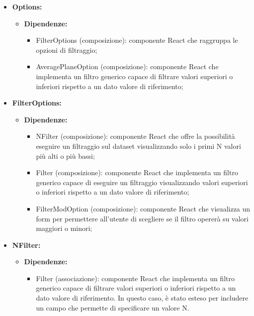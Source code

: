 \begin{itemize}
    \item \textbf{Options:}
    \begin{itemize}
        \item \textbf{Dipendenze:}
        \begin{itemize}
            \item FilterOptions (composizione): componente React che raggruppa le opzioni di filtraggio;
            \item AveragePlaneOption (composizione): componente React che implementa un filtro generico capace di filtrare valori superiori o inferiori rispetto a un dato valore di riferimento;
        \end{itemize} 
    \end{itemize}

    \item \textbf{FilterOptions:}
    \begin{itemize}
        \item \textbf{Dipendenze:}
        \begin{itemize}
            \item NFilter (composizione): componente React che offre la possibilità eseguire un filtraggio sul dataset visualizzando solo i primi N valori più alti o più bassi;
            \item Filter (composizione): componente React che implementa un filtro generico capace di  eseguire un filtraggio visualizzando valori superiori o inferiori rispetto a un dato valore di riferimento;
            \item FilterModOption (composizione): componente React che visualizza un form per permettere all'utente di scegliere se il filtro opererà su valori maggiori o minori;
        \end{itemize} 
    \end{itemize}

    \item \textbf{NFilter:}
    \begin{itemize}
        \item \textbf{Dipendenze:}
        \begin{itemize}
            \item Filter (associazione): componente React che implementa un filtro generico capace di filtrare valori superiori o inferiori rispetto a un dato valore di riferimento.
            In questo caso, è stato esteso per includere un campo che permette di specificare un valore N.
        \end{itemize} 
    \end{itemize}
\end{itemize}

